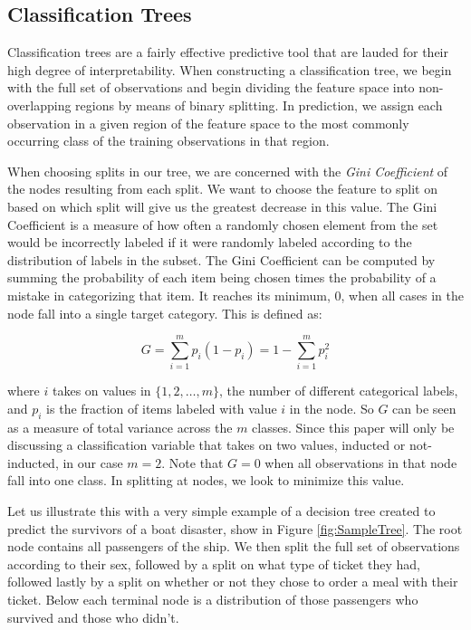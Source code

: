 \documentclass[preprint,12pt]{elsarticle}
\begin{document}
\subsection{Classification Trees}
Classification trees are a fairly effective predictive tool that are lauded for their high degree of interpretability. When constructing a classification tree, we begin with the full set of observations and begin dividing the feature space into non-overlapping regions by means of binary splitting. In prediction, we assign each observation in a given region of the feature space to the most commonly occurring class of the training observations in that region. 

When choosing splits in our tree, we are concerned with the \textit{Gini Coefficient} of the nodes resulting from each split. We want to choose the feature to split on based on which split will give us the greatest decrease in this value. The Gini Coefficient is a measure of how often a randomly chosen element from the set would be incorrectly labeled if it were randomly labeled according to the distribution of labels in the subset. The Gini Coefficient can be computed by summing the probability of each item being chosen times the probability of a mistake in categorizing that item. It reaches its minimum, $0$, when all cases in the node fall into a single target category. This is defined as:

$$G = \sum\limits_{i=1}^m p_{i}(1-p_{i}) = 1 - \sum\limits_{i=1}^m p_{i}^{2}$$

\noindent where $i$ takes on values in $\{1,2,\ldots,m\}$, the number of different categorical labels, and $p_i$ is the fraction of items labeled with value $i$ in the node. So $G$ can be seen as a measure of total variance across the $m$ classes. Since this paper will only be discussing a classification variable that takes on two values, inducted or not-inducted, in our case $m=2$. Note that $G = 0$ when all observations in that node fall into one class. In splitting at nodes, we look to minimize this value.

Let us illustrate this with a very simple example of a decision tree created to predict the survivors of a boat disaster, show in Figure \ref{fig:SampleTree}. The root node contains all passengers of the ship. We then split the full set of observations according to their sex, followed by a split on what type of ticket they had, followed lastly by a split on whether or not they chose to order a meal with their ticket. Below each terminal node is a distribution of those passengers who survived and those who didn't. 
\end{document}
